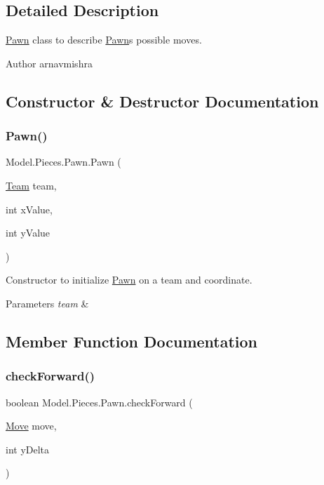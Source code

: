 \subsection{Detailed Description}
\hyperlink{class_model_1_1_pieces_1_1_pawn}{Pawn} class to describe \hyperlink{class_model_1_1_pieces_1_1_pawn}{Pawn}\textquotesingle{}s possible moves. \begin{DoxyAuthor}{Author}
arnavmishra 
\end{DoxyAuthor}


\subsection{Constructor \& Destructor Documentation}
\hypertarget{class_model_1_1_pieces_1_1_pawn_ad3d3d740e79b02e16c5cc4b2da2f25bf}{}\label{class_model_1_1_pieces_1_1_pawn_ad3d3d740e79b02e16c5cc4b2da2f25bf} 
\subsubsection{\texorpdfstring{Pawn()}{Pawn()}}
{\footnotesize\ttfamily Model.\+Pieces.\+Pawn.\+Pawn (\begin{DoxyParamCaption}\item[{\hyperlink{class_model_1_1_team}{Team}}]{team,  }\item[{int}]{x\+Value,  }\item[{int}]{y\+Value }\end{DoxyParamCaption})}

Constructor to initialize \hyperlink{class_model_1_1_pieces_1_1_pawn}{Pawn} on a team and coordinate. 
\begin{DoxyParams}{Parameters}
{\em team} & \\
\hline
\end{DoxyParams}


\subsection{Member Function Documentation}
\hypertarget{class_model_1_1_pieces_1_1_pawn_a1088583c9809266ccefc49ce8d272d24}{}\label{class_model_1_1_pieces_1_1_pawn_a1088583c9809266ccefc49ce8d272d24} 
\subsubsection{\texorpdfstring{check\+Forward()}{checkForward()}}
{\footnotesize\ttfamily boolean Model.\+Pieces.\+Pawn.\+check\+Forward (\begin{DoxyParamCaption}\item[{\hyperlink{class_model_1_1_move}{Move}}]{move,  }\item[{int}]{y\+Delta }\end{DoxyParamCaption})}

